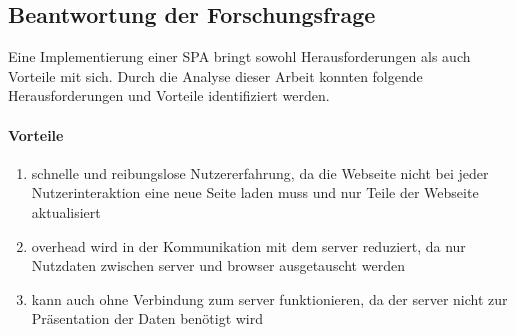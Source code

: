 


\subsection{Beantwortung der Forschungsfrage}
Eine Implementierung einer \ac{SPA} bringt sowohl Herausforderungen als auch Vorteile mit sich.
Durch die Analyse dieser Arbeit konnten folgende Herausforderungen und Vorteile identifiziert werden.

\paragraph*{Vorteile}
\begin{enumerate}
    \item schnelle und reibungslose Nutzererfahrung, da die Webseite nicht bei jeder Nutzerinteraktion eine neue Seite laden muss und nur Teile der Webseite aktualisiert
    \item \gls{overhead} wird in der Kommunikation mit dem \gls{server} reduziert, da nur Nutzdaten zwischen \gls{server} und \gls{browser} ausgetauscht werden
    \item kann auch ohne Verbindung zum \gls{server} funktionieren, da der \gls{server} nicht zur Präsentation der Daten benötigt wird
\end{enumerate}

